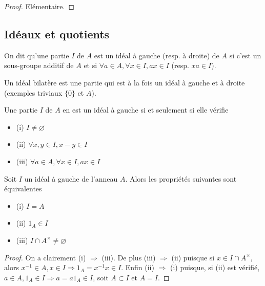 \begin{proof}
Elémentaire.
\end{proof}

\subsection{Idéaux et quotients}

\begin{de}
On dit qu'une partie $I$ de $A$ est un idéal à gauche
(resp. à droite) de $A$ si c'est un sous-groupe additif de $A$ et si
$\forall a \in A, \forall x \in I, ax \in I$ (resp. $xa \in I$).
\end{de}

\begin{de}
Un idéal bilatère est une partie qui est à la fois un
idéal à gauche et à droite (exemples triviaux
$\{0\}$ et $A$).
\end{de}

\begin{prop}
Une partie $I$ de $A$ en est un idéal à gauche si et
seulement si elle vérifie

\begin{itemize}
\itemsep1pt\parskip0pt
\item
  (i) $I \neq \varnothing$
\item
  (ii) $\forall x,y \in I, x - y \in I$
\item
  (iii) $\forall a \in A, \forall x \in I, ax \in I$
\end{itemize}
\end{prop}

\begin{prop}
Soit $I$ un idéal à gauche de l'anneau $A$. Alors les
propriétés suivantes sont équivalentes

\begin{itemize}
\itemsep1pt\parskip0pt
\item
  (i) $I = A$
\item
  (ii) $1_A \in I$
\item
  (iii) $I \cap A^\times \neq \varnothing$
\end{itemize}
\end{prop}

\begin{proof}
On a clairement (i) $\Rightarrow$ (iii). De plus (iii) $\Rightarrow$ (ii) puisque si
$x \in I \cap A^\times$, alors $x^{-1} \in A, x \in I \Rightarrow 1_A =
x^{-1}x \in I$. Enfin (ii) $\Rightarrow$ (i) puisque, si (ii) est vérifié, $a \in
A, 1_A \in I \Rightarrow a = a1_A \in I$, soit $A \subset I$ et $A = I$.
\end{proof}

